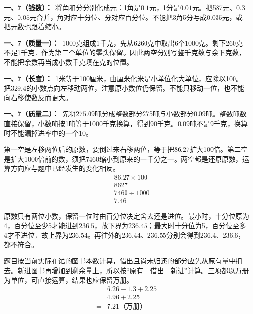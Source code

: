 \documentclass[multi=snippet,border=0pt]{standalone}
\newenvironment{snippet}[3]{\begin{minipage}{#1bp}\color{answerred}\fontsize{#2}{#3}\selectfont\raggedright}{\end{minipage}}
\begin{document}
\begin{snippet}{505}{11.5}{14}\textbf{一、7（钱数）：}\ 将角和分分别化成元：1角是\(0.1\)元，1分是\(0.01\)元。把587元、\(0.3\)元、\(0.05\)元合并，角对应十分位、分对应百分位。不能把3角5分写成\(0.035\)元，或把元数也跟着缩小。\end{snippet}
\begin{snippet}{505}{11.5}{14}\textbf{一、7（质量一）：}\ 1000克组成1千克，先从6260克中取出6个1000克。剩下260克不足1千克，作为第二个单位的零头保留。因此两空分别写整千克数与余下克数，不能把余数再当成小数千克填在克的位置。\end{snippet}
\begin{snippet}{505}{11.5}{14}\textbf{一、7（长度）：}\ 1米等于100厘米，由厘米化米是小单位化大单位，应除以100。把\(329.4\)的小数点向左移动两位，注意原小数位仍保留。不能只移动一位，也不能向右移使数反而更大。\end{snippet}
\begin{snippet}{505}{11.5}{14}\textbf{一、7（质量二）：}\ 先将\(275.09\)吨分成整数部分275吨与小数部分\(0.09\)吨。整数吨数直接保留，小数吨按1吨等于1000千克换算，得到90千克。\(0.09\)吨不是9千克，换算时不能漏掉进率中的一个10。\end{snippet}
\begin{snippet}{505}{11.5}{14}第一空是左移两位后的原数，要倒过来右移两位，等于把\(86.27\)扩大100倍。第二空是扩大1000倍前的数，须把7460缩小到原来的一千分之一。两空都是还原原数，运算方向应与题中已经发生的变化相反。\[\begin{aligned}&86.27\times100\\={}&8627\\&7460\div1000\\={}&7.46\end{aligned}\]\end{snippet}
\begin{snippet}{505}{11.5}{14}原数只有两位小数，保留一位时由百分位决定舍去还是进位。最小时，十分位原为4，百分位至少5才能进到\(236.5\)，故下界为\(236.45\)；最大时十分位为5，百分位至多4才不进位，故上界为\(236.54\)。再往外的\(236.44\)、\(236.55\)分别会得到\(236.4\)、\(236.6\)，都不符合。\end{snippet}
\begin{snippet}{505}{11.5}{14}题目按当前实际在馆的图书本数计算，借出且尚未归还的部分应先从原有量中扣去。新进图书再增加到剩余量上，所以按“原有－借出＋新进”计算。三项都以万册为单位，可直接运算，结果也应保留万册。\[\begin{aligned}&6.26-1.3+2.25\\={}&4.96+2.25\\={}&7.21\text{（万册）}\end{aligned}\]\end{snippet}
\end{document}
